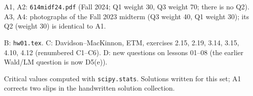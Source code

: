 \documentclass[11pt]{article}
\begin{document}
\begin{transcriptnotes}
  \item A1, A2: \texttt{614midf24.pdf} (Fall 2024; Q1 weight 30, Q3 weight 70; there is no Q2).
        A3, A4: photographs of the Fall 2023 midterm (Q3 weight 40, Q1 weight 30); its Q2
        (weight 30) is identical to A1.
  \item B: \texttt{hw01.tex}. C: Davidson--MacKinnon, ETM, exercises 2.15, 2.19, 3.14, 3.15, 4.10, 4.12
        (renumbered C1--C6). D: new questions on lessons 01--08 (the earlier Wald/LM question is now D5(e)).
  \item Critical values computed with \texttt{scipy.stats}. Solutions written for this set;
        A1 corrects two slips in the handwritten solution collection.
\end{transcriptnotes}
\end{document}
